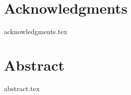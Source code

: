 
\chapter*{Acknowledgments}
{acknowledgments.tex}

\chapter*{Abstract}
{abstract.tex}

\tableofcontents
